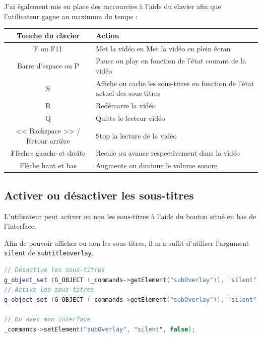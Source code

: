 \documentclass[a4paper, 11pt]{article}
\begin{document}
	J'ai également mis en place des raccourcies à l'aide du clavier afin que l'utilisateur gagne au maximum du temps : 

	\begin{tabular}{c|p{10cm}}
		\textbf{Touche du clavier} & \textbf{Action}\\
		\hline
		F ou F11& Met la vidéo en Met la vidéo en plein écran\\
		\hline
		Barre d'espace ou P&Pause ou play en fonction de l'état courant de la vidéo\\
		\hline
		S&Affiche ou cache les sous-titres en fonction de l'état actuel des sous-titres\\
		\hline
		R&Redémarre la vidéo\\
		\hline
		Q&Quitte le lecteur vidéo\\
		\hline
		<< Backspace >> / Retour arrière &Stop la lecture de la vidéo \\
		\hline
		Flèches gauche et droite&Recule ou avance respectivement dans la vidéo\\
		\hline
		Flèche haut et bas & Augmente ou diminue le volume sonore\\
		\hline
	\end{tabular}
	\subsection{Activer ou désactiver les sous-titres}
	L'utilisateur peut activer ou non les sous-titres à l'aide du bouton situé en bas de l'interface. 

	Afin de pouvoir afficher ou non les sous-titres, il m'a suffit d'utiliser l'argument \texttt{silent} de \texttt{subtitleoverlay}.
	\begin{lstlisting}[language=C++, caption=Affichage ou non des sous-titres]
// Désactive les sous-titres
g_object_set (G_OBJECT (_commands->getElement("subOverlay")), "silent", false, NULL); 
// Active les sous-titres
g_object_set (G_OBJECT (_commands->getElement("subOverlay")), "silent", true, NULL); 

// Ou avec mon interface
_commands->setElement("subOverlay", "silent", false);

	\end{lstlisting}
	\appendix
	\lstlistoflistings
	\listoffigures
	
\end{document}
